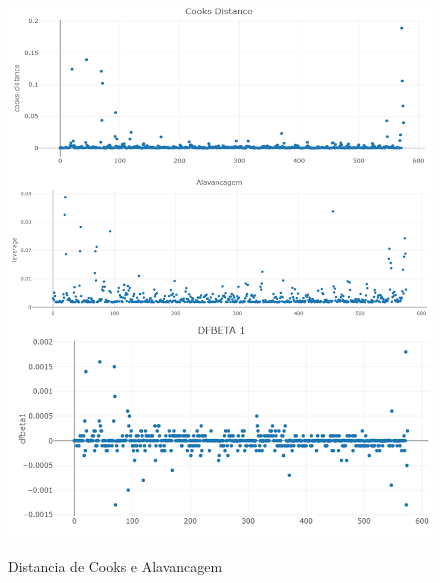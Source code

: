 		 \begin{minipage}[t!]{0.32\textwidth}
				\begin{figure}[H]
					\centering  \small \caption{Distancia de Cooks e Alavancagem}
					\includegraphics[width=0.85\linewidth]{FIGURAS/dist-cook-alavan}
					\label{fig:DISTCOOK}
				\end{figure}
				
			\end{minipage}\hfill
